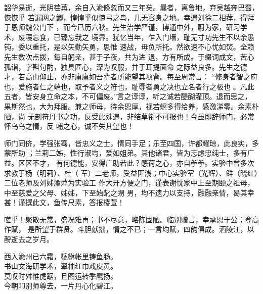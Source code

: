 \begin{ack}

韶华易逝，光阴荏苒，余自入渝倏忽而又三年矣。曩者，离鲁地，弃吴越奔巴蜀，恢恢乎
若漏网之鲫，惶惶乎似惊弓之鸟，几无容身之地。幸遇刘徐二相荐，得拜于恩师魏公门下
，而今已历六秋。先生治学严谨，博通中外，蔚为家，研习学术，废寝忘食，已臻忘我之
境界。犹忆当年，乍入门墙，耻无寸功先生不以余愚钝，委以重托，是以矢勤矢勇，思惟
速战，毋负所托。然欲速不心忧如焚。全赖先生数次点拨，每自躬亲，甚于子夜，共为进
退，方有所成。于缀词成文，苦心孤诣，字斟句酌，独具匠心，深为叹服，并于耳提面命
之际益良多。先生之德才，若高山仰止，亦非庸庸如吾辈者所能望其项背。每至周常言：
“修身者智之府也，爱施者仁之端也，取予者义之符也，耻辱者勇之决也立名者行之极也
。凡此五者，皆安身立命之本，不可偏废。”言之谆谆，听之诚若醍醐灌顶。退而思之，
果斯然也，大为拜服。兼之师母，待余恩厚，视若螟多得给养，感激涕零。余素朴陋，尚
无剖符丹书之功，反受此殊遇，非结草衔不可报也！今虽即辞师门，必常怀乌鸟之情，反
哺之心，诚不失其望也！

师门同侪，学强张骞，皆忠义之士，情同手足；乐至四国，许都耀琼，此良实，多蒙所助
；兰莉二姊，性行淑均，爱如姐弟。其他诸君，皆为志虑忠纯士，多有广益。区区不才，
有何德能，安得广助若此？感荷之心，亦自拳拳。实验中曾多次求教于杨（明莉）、杜（
军）二老师，受益匪浅；中心实验室（光辉）、鲜（晓红）二位老师及刘姊渝萍为实验工
作大开方便之门，谨表谢忱家中上至期颐之祖母，中至慈爱之父母、姊姊，下至始龀之甥
男，均不遗力以支持，融融亲情，曷其幸甚！谨撰此文，鱼传尺素，答报椿萱！

嗟乎！聚散无常，盛况难再；书不尽意，略陈固陋。临别赠言，幸承恩于公；登高作赋，
是所望于群贤。斗胆献拙，情之不已；一言均赋，四韵俱成。洒陵江，以酹逝去之岁月。

\begin{center}
西入渝州已六霜，貔貅帐里铸鱼肠。\\
书山文海研学术，翠袖红巾戏皮黄。\\
莫叹时舛惟虎踞，且图运转季鹰扬。\\
今朝叩别师尊去，一片丹心化碧江。
\end{center}

\end{ack}
